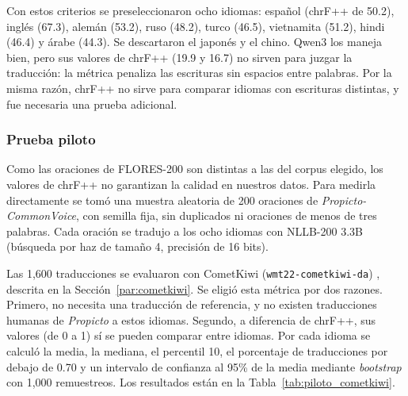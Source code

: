 Con estos criterios se preseleccionaron ocho idiomas: español (chrF++ de 50.2), inglés (67.3), alemán (53.2), ruso (48.2), turco (46.5), vietnamita (51.2), hindi (46.4) y árabe (44.3). Se descartaron el japonés y el chino. Qwen3 los maneja bien, pero sus valores de chrF++ (19.9 y 16.7) no sirven para juzgar la traducción: la métrica penaliza las escrituras sin espacios entre palabras. Por la misma razón, chrF++ no sirve para comparar idiomas con escrituras distintas, y fue necesaria una prueba adicional.
 
\subsubsection{Prueba piloto}
Como las oraciones de FLORES-200 son distintas a las del corpus elegido, los valores de chrF++ no garantizan la calidad en nuestros datos. Para medirla directamente se tomó una muestra aleatoria de 200 oraciones de \textit{Propicto-CommonVoice}, con semilla fija, sin duplicados ni oraciones de menos de tres palabras.
Cada oración se tradujo a los ocho idiomas con NLLB-200 3.3B (búsqueda por haz de tamaño 4, precisión de 16 bits).
 
Las 1,600 traducciones se evaluaron con CometKiwi (\texttt{wmt22-cometkiwi-da}) \cite{rei2022cometkiwi}, descrita en la Sección~\ref{par:cometkiwi}. Se eligió esta métrica por dos razones. Primero, no necesita una traducción de referencia, y no existen traducciones humanas de \textit{Propicto} a estos idiomas. Segundo, a diferencia de chrF++, sus valores (de 0 a 1) sí se pueden comparar entre idiomas. Por cada idioma se calculó la media, la mediana, el percentil 10, el porcentaje de traducciones por debajo de 0.70 y un intervalo de confianza al 95\% de la media mediante \textit{bootstrap} con 1,000 remuestreos. Los resultados están en la Tabla~\ref{tab:piloto_cometkiwi}.
 
